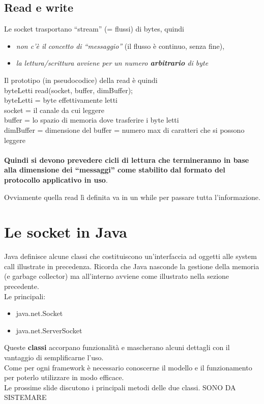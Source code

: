 \section{Read e write}
Le socket trasportano “stream” (= flussi) di bytes, quindi
\begin{itemize}
    \item \textit{non c'è il concetto di “messaggio”} (il flusso è continuo, senza fine),
    \item \textit{la lettura/scrittura avviene per un numero \textbf{arbitrario} di byte}
\end{itemize}
Il prototipo (in pseudocodice) della read è quindi
\\byteLetti read(socket, buffer, dimBuffer);
\\byteLetti = byte effettivamente letti
\\socket = il canale da cui leggere
\\buffer = lo spazio di memoria dove trasferire i byte letti
\\dimBuffer = dimensione del buffer = numero max di caratteri che si possono leggere
\\
\\\textbf{Quindi si devono prevedere cicli di lettura che termineranno in base alla dimensione dei “messaggi” come stabilito dal formato del protocollo applicativo in uso}.


Ovviamente quella read lì definita va in un while per passare tutta l'informazione.

\chapter{Le socket in Java}
Java definisce alcune classi che costituiscono un'interfaccia ad oggetti alle system call illustrate in precedenza. Ricorda che Java nasconde la gestione della memoria (e garbage collector) ma all'interno avviene come illustrato nella sezione precedente.
\\Le principali:
\begin{itemize}
    \item java.net.Socket
    \item java.net.ServerSocket
\end{itemize}
Queste \textbf{classi} accorpano funzionalità e mascherano alcuni dettagli con il vantaggio di semplificarne l'uso.
\\Come per ogni framework è necessario conoscerne il modello e il funzionamento per poterlo utilizzare in modo efficace.
\\Le prossime slide discutono i principali metodi delle due classi. SONO DA SISTEMARE

